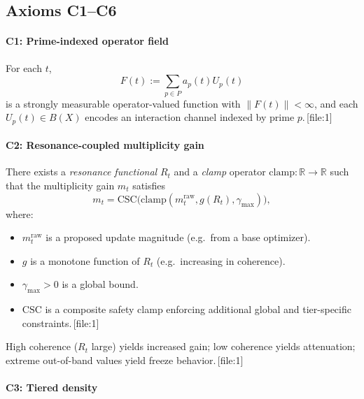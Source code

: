 \documentclass[11pt]{article}
\begin{document}
\subsection{Axioms C1--C6}

\paragraph{C1: Prime-indexed operator field}

\begin{description}[leftmargin=1.5em]
\item[C1.] For each $t$,
\[
  F(t) := \sum_{p \in P} a_p(t) U_p(t)
\]
is a strongly measurable operator-valued function with $\|F(t)\| < \infty$, and each $U_p(t) \in B(X)$ encodes an interaction channel indexed by prime $p$.\,[file:1]
\end{description}

\paragraph{C2: Resonance-coupled multiplicity gain}

\begin{description}[leftmargin=1.5em]
\item[C2.] There exists a \emph{resonance functional} $R_t$ and a \emph{clamp} operator $\mathrm{clamp} : \mathbb{R} \to \mathbb{R}$ such that the multiplicity gain $m_t$ satisfies
\[
  m_t = \mathrm{CSC}\bigl(\mathrm{clamp}(m^{\mathrm{raw}}_t, g(R_t), \gamma_{\max})\bigr),
\]
where:
\begin{itemize}[leftmargin=1.5em]
  \item $m^{\mathrm{raw}}_t$ is a proposed update magnitude (e.g.\ from a base optimizer).
  \item $g$ is a monotone function of $R_t$ (e.g.\ increasing in coherence).
  \item $\gamma_{\max} > 0$ is a global bound.
  \item $\mathrm{CSC}$ is a composite safety clamp enforcing additional global and tier-specific constraints.\,[file:1]
\end{itemize}
High coherence ($R_t$ large) yields increased gain; low coherence yields attenuation; extreme out-of-band values yield freeze behavior.\,[file:1]
\end{description}

\paragraph{C3: Tiered density}
\end{document}
